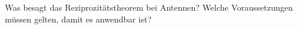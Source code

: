 \begin{question}[section=11,name={Reziprozitätstheorem},difficulty=,quantity=,type=thr,tags={20131024,20130724}]
	Was besagt das Reziprozitätstheorem bei Antennen? Welche Voraussetzungen müssen gelten, damit es anwendbar ist?
	
	
\end{question}
\begin{solution}
	
\end{solution}